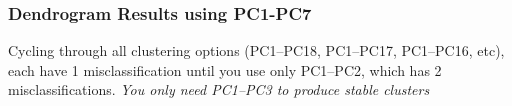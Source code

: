 \documentclass[10pt]{beamer}
\begin{document}
\begin{frame}[fragile]
\frametitle{Dendrogram Results using PC1-PC7}

\begin{center}
\end{center}

\vspace*{-4ex} {\scriptsize Cycling through all clustering options
  (PC1--PC18, PC1--PC17, PC1--PC16, etc), each have 1
  misclassification until you use only PC1--PC2, which
  has 2 misclassifications. 
{\color{blue} \em You only need PC1--PC3 to produce
  stable clusters\\}
}

\end{frame}
\end{document}
